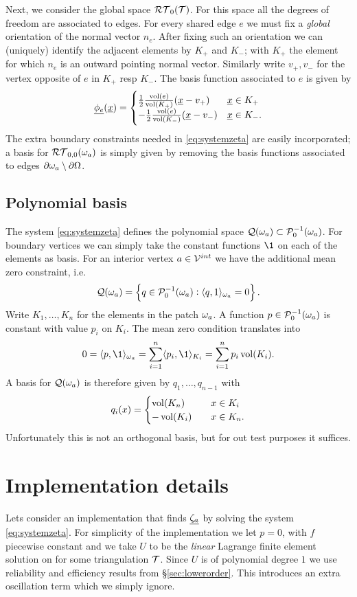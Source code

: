 \documentclass[thesis.tex]{subfiles}
\begin{document}
Next, we consider the global space $\mathcal{RT}_0(\mathcal{T})$. For this space all the degrees of freedom are associated
to edges. For every shared edge $e$ we must fix a \emph{global} orientation of the normal vector $n_e$. After fixing such an orientation we can (uniquely) identify the adjacent elements by $K_+$ and $K_-$; with $K_+$ the element for which $n_e$
is an outward pointing normal vector. Similarly write $v_+, v_-$ for the vertex opposite of $e$ in $K_+$ resp $K_-$. The
basis function associated to $e$ is given by
\[
  \underline{\phi_e}(\underline{x}) = \begin{cases}
    \frac{1}{2}\frac{\operatorname{vol}(e)}{\operatorname{vol}(K_+)}( \underline{x} - v_+) & \underline{x} \in K_+\\
    - \frac{1}{2}\frac{\operatorname{vol}(e)}{\operatorname{vol}(K_-)}( \underline{x} - v_-) & \underline{x} \in K_-.
\end{cases}
\]
The extra boundary constraints needed in \eqref{eq:systemzeta} are easily incorporated; a basis for $\mathcal{RT}_{0,0}(\omega_a)$ is simply given
by removing the basis functions associated to edges $\partial \omega_a \setminus \partial \Omega$.
\subsection{Polynomial basis}
The system \eqref{eq:systemzeta} defines the polynomial space $\mathcal{Q}(\omega_a) \subset \mathcal{P}_0^{-1}(\omega_a)$. For boundary
vertices we can simply take the constant functions $\1$ on each of the elements as basis. For an interior vertex $a \in \mathcal{V}^{int}$
we have the additional mean zero constraint, i.e.
\[
  \mathcal{Q}(\omega_a) = \set{q \in \mathcal{P}_0^{-1}(\omega_a) :  \langle q,1 \rangle_{\omega_a} = 0}.
\]
Write $K_1,\dots, K_n$ for the elements in the patch $\omega_a$. A function $p \in \mathcal{P}_0^{-1}(\omega_a)$ is constant
with value $p_i$ on $K_i$. The mean zero condition translates into
\[
  0 = \ip{p,\1}_{\w_a} = \sum_{i =1}^n \ip{p_i, \1}_{K_i} = \sum_{i=1}^n p_i \vol(K_i).
\]
A basis for $\mathcal{Q}(\omega_a)$ is therefore given by $q_1, \dots, q_{n-1}$ with
\[
  q_i(x) = \begin{cases}
    \operatorname{vol}(K_n) & \quad x \in K_i\\
    -\operatorname{vol}(K_i) & \quad x \in K_n.
  \end{cases}
\]
Unfortunately this is not an orthogonal basis, but for out test purposes it suffices.
\section{Implementation details}
Lets consider an implementation that finds $\underline{\zeta_a}$ by solving the system \eqref{eq:systemzeta}. 
For simplicity of the implementation we let $p=0$, with $f$ piecewise constant and we take $U$ to be the \emph{linear} Lagrange finite element solution on for some triangulation $\mathcal{T}$. 
Since $U$ is of polynomial degree $1$ we use reliability and efficiency results from \S\ref{sec:lowerorder}. This introduces an extra oscillation term which we simply ignore.
\end{document}

